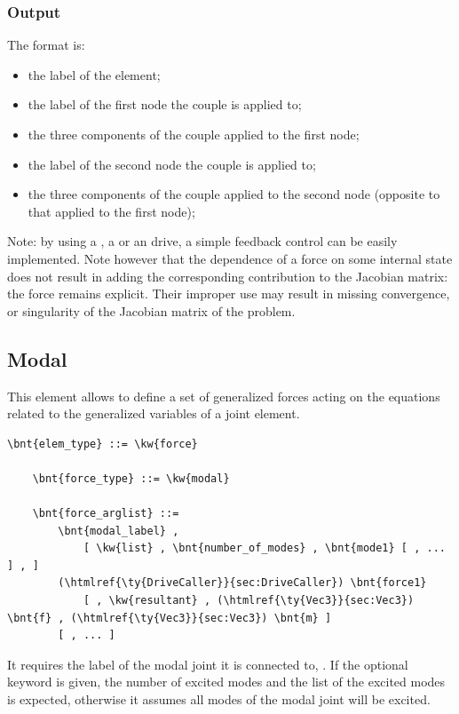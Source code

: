 \subsubsection{Output}
The format is:
\begin{itemize}
    \item the label of the element;
    \item the label of the first node the couple is applied to;
    \item the three components of the couple applied to the first node;
    \item the label of the second node the couple is applied to;
    \item the three components of the couple applied to the second node
	  (opposite to that applied to the first node);
\end{itemize}

\bigskip
Note: by using a , a  or an  drive,
a simple feedback control can be easily implemented.
Note however that the dependence of a force on some internal state
does not result in adding the corresponding contribution 
to the Jacobian matrix: the force remains explicit.
Their improper use may result in missing convergence,
or singularity of the Jacobian matrix of the problem.

\subsection{Modal}
\label{sec:EL:FORCE:MODAL}
This element allows to define a set of generalized forces
acting on the equations related to the generalized variables
of a  joint element.
\begin{Verbatim}[commandchars=\\\{\}]
    \bnt{elem_type} ::= \kw{force}

    \bnt{force_type} ::= \kw{modal}

    \bnt{force_arglist} ::=
        \bnt{modal_label} ,
            [ \kw{list} , \bnt{number_of_modes} , \bnt{mode1} [ , ... ] , ]
        (\htmlref{\ty{DriveCaller}}{sec:DriveCaller}) \bnt{force1}
            [ , \kw{resultant} , (\htmlref{\ty{Vec3}}{sec:Vec3}) \bnt{f} , (\htmlref{\ty{Vec3}}{sec:Vec3}) \bnt{m} ]
        [ , ... ]
\end{Verbatim}
It requires the label of the modal joint it is connected to,
.
If the optional keyword  is given, the number of excited modes
 and the list of the excited modes is expected,
otherwise it assumes all modes of the  modal joint
will be excited.

